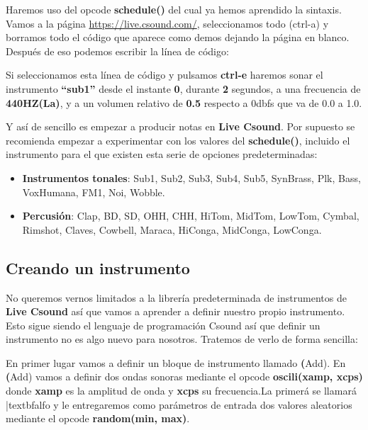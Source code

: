 Haremos uso del opcode \textbf{schedule()} del cual ya hemos aprendido la sintaxis.
Vamos a la página \url{https://live.csound.com/}, seleccionamos todo (ctrl-a) y borramos todo el código que aparece como demos dejando la página en blanco. Después de eso podemos escribir la línea de código:

 
 Si seleccionamos esta línea de código y pulsamos \textbf{ctrl-e} haremos sonar el instrumento \textbf{``sub1''} desde el instante \textbf{0}, durante \textbf{2} segundos, a una frecuencia de \textbf{440HZ(La)}, y a un volumen relativo de \textbf{0.5} respecto a 0dbfs que va de 0.0 a 1.0.
 
 Y así de sencillo es empezar a producir notas en \textbf{Live Csound}. Por supuesto se recomienda empezar a experimentar con los valores del \textbf{schedule()}, incluido el instrumento para el que existen esta serie de opciones predeterminadas:
 
 \begin{itemize}
 \item \textbf{Instrumentos tonales}: Sub1, Sub2, Sub3, Sub4, Sub5, SynBrass, Plk, Bass, VoxHumana, FM1, Noi, Wobble.
 \item \textbf{Percusión}: Clap, BD, SD, OHH, CHH, HiTom, MidTom, LowTom, Cymbal, Rimshot, Claves, Cowbell, Maraca, HiConga, MidConga, LowConga.
\end{itemize}
 
\subsection{Creando un instrumento}

No queremos vernos limitados a la librería predeterminada de instrumentos de \textbf{Live Csound} así que vamos a aprender a definir nuestro propio instrumento. Esto sigue siendo el lenguaje de programación Csound así que definir un instrumento no es algo nuevo para nosotros. Tratemos de verlo de forma sencilla:

 
En primer lugar vamos a definir un bloque de instrumento llamado \textbf(Add). En \textbf(Add) vamos a definir dos ondas sonoras mediante el opcode \textbf{oscili(xamp, xcps)} donde \textbf{xamp} es la amplitud de onda y \textbf{xcps} su frecuencia.La primerá se llamará |textbf{alfo} y le entregaremos como parámetros de entrada dos valores aleatorios mediante el opcode \textbf{random(min, max)}. 

